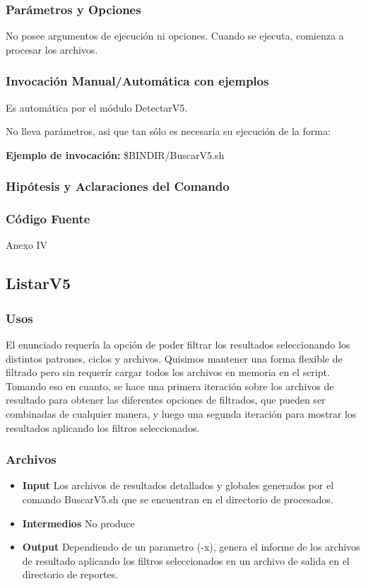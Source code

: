\documentclass[a4paper,10pt,titlepage]{article}
\begin{document}
		\subsubsection{Par\'ametros y Opciones}
			 No posee argumentos de ejecución ni opciones. Cuando se ejecuta, comienza a procesar los archivos.
	
		\subsubsection{Invocaci\'on Manual/Autom\'atica con ejemplos}
Es automática por el módulo DetectarV5. 

No lleva parámetros, asi que tan sólo es necesaria su ejecución de la forma:

{\bf Ejemplo de invocación:} 
\$BINDIR/BuscarV5.sh


		\subsubsection{Hip\'otesis y Aclaraciones del Comando}

		\subsubsection{C\'odigo Fuente}
			Anexo IV

	\subsection{ListarV5}
		\subsubsection{Usos}
			 
El enunciado requería la opción de poder filtrar los resultados seleccionando los distintos patrones, ciclos y archivos. Quisimos mantener una forma flexible de filtrado pero sin requerír cargar todos los archivos en memoria en el script. Tomando eso en cuanto, se hace una primera iteración sobre los archivos de resultado para obtener las diferentes opciones de filtrados, que pueden ser combinadas de cualquier manera, y luego una segunda iteración para mostrar los resultados aplicando los filtros seleccionados.

		\subsubsection{Archivos}
			\begin {itemize}
				\item \textbf{Input} {Los archivos de resultados detallados y globales generados por el comando BuscarV5.sh que se encuentran en el directorio de procesados.}
				\item \textbf{Intermedios} {No produce}
				\item \textbf{Output} {Dependiendo de un parametro (-x), genera el informe de los archivos de resultado aplicando los filtros seleccionados en un archivo de salida en el directorio de reportes.}
			\end{itemize}
\end{document}
